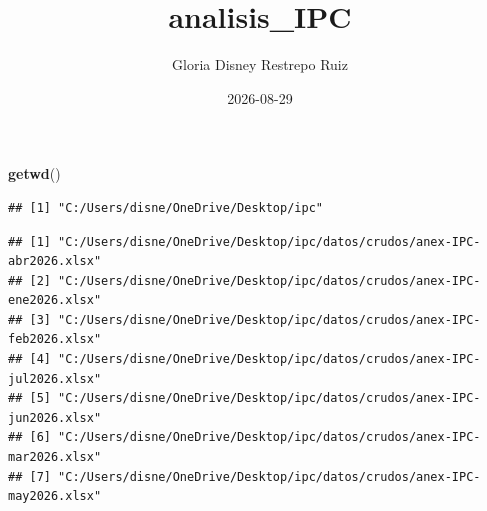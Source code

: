 \documentclass[
]{article}
\title{analisis\_IPC}
\author{Gloria Disney Restrepo Ruiz}
\date{2026-08-29}
\newenvironment{Shaded}{\begin{snugshade}}{\end{snugshade}}
\newcommand{\AttributeTok}[1]{\textcolor[rgb]{0.13,0.29,0.53}{#1}}
\newcommand{\CommentTok}[1]{\textcolor[rgb]{0.56,0.35,0.01}{\textit{#1}}}
\newcommand{\ConstantTok}[1]{\textcolor[rgb]{0.56,0.35,0.01}{#1}}
\newcommand{\FunctionTok}[1]{\textcolor[rgb]{0.13,0.29,0.53}{\textbf{#1}}}
\newcommand{\NormalTok}[1]{#1}
\newcommand{\OtherTok}[1]{\textcolor[rgb]{0.56,0.35,0.01}{#1}}
\newcommand{\SpecialCharTok}[1]{\textcolor[rgb]{0.81,0.36,0.00}{\textbf{#1}}}
\newcommand{\StringTok}[1]{\textcolor[rgb]{0.31,0.60,0.02}{#1}}
\begin{document}
\maketitle

\begin{Shaded}
\begin{Highlighting}[]
\FunctionTok{getwd}\NormalTok{()}
\end{Highlighting}
\end{Shaded}

\begin{verbatim}
## [1] "C:/Users/disne/OneDrive/Desktop/ipc"
\end{verbatim}

\begin{Shaded}
\end{Shaded}

\begin{verbatim}
## [1] "C:/Users/disne/OneDrive/Desktop/ipc/datos/crudos/anex-IPC-abr2026.xlsx"
## [2] "C:/Users/disne/OneDrive/Desktop/ipc/datos/crudos/anex-IPC-ene2026.xlsx"
## [3] "C:/Users/disne/OneDrive/Desktop/ipc/datos/crudos/anex-IPC-feb2026.xlsx"
## [4] "C:/Users/disne/OneDrive/Desktop/ipc/datos/crudos/anex-IPC-jul2026.xlsx"
## [5] "C:/Users/disne/OneDrive/Desktop/ipc/datos/crudos/anex-IPC-jun2026.xlsx"
## [6] "C:/Users/disne/OneDrive/Desktop/ipc/datos/crudos/anex-IPC-mar2026.xlsx"
## [7] "C:/Users/disne/OneDrive/Desktop/ipc/datos/crudos/anex-IPC-may2026.xlsx"
\end{verbatim}
\end{document}
